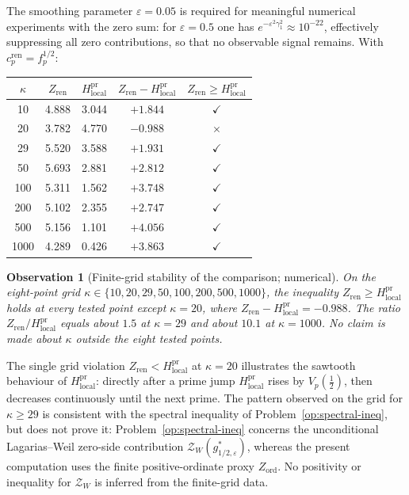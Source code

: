 \documentclass[11pt]{article}
\newtheorem{observation}[theorem]{Observation}
\newcommand{\Hlocal}{H_{\mathrm{local}}}
\newcommand{\cren}{c_p^{\mathrm{ren}}}
\newcommand{\Zren}{Z_{\mathrm{ren}}}
\begin{document}
The smoothing parameter $\varepsilon=0.05$ is required for
meaningful numerical experiments with the zero sum: for
$\varepsilon=0.5$ one has $e^{-\varepsilon^2\gamma_1^2}\approx
10^{-22}$, effectively suppressing all zero contributions, so
that no observable signal remains.
With $\cren=f_p^{1/2}$:

\begin{center}
\begin{tabular}{ccccc}
\toprule
$\kappa$ & $\Zren$ & $\Hlocal^{\mathrm{pr}}$
         & $\Zren-\Hlocal^{\mathrm{pr}}$
         & $\Zren\ge\Hlocal^{\mathrm{pr}}$ \\
\midrule
10   & 4.888 & 3.044 & $+1.844$ & $\checkmark$ \\
20   & 3.782 & 4.770 & $-0.988$ & $\times$ \\
29   & 5.520 & 3.588 & $+1.931$ & $\checkmark$ \\
50   & 5.693 & 2.881 & $+2.812$ & $\checkmark$ \\
100  & 5.311 & 1.562 & $+3.748$ & $\checkmark$ \\
200  & 5.102 & 2.355 & $+2.747$ & $\checkmark$ \\
500  & 5.156 & 1.101 & $+4.056$ & $\checkmark$ \\
1000 & 4.289 & 0.426 & $+3.863$ & $\checkmark$ \\
\bottomrule
\end{tabular}
\end{center}

\begin{observation}[Finite-grid stability of the comparison; numerical]\label{obs:Z-vs-H}
On the eight-point grid
$\kappa\in\{10,20,29,50,100,200,500,1000\}$, the inequality
$\Zren\ge\Hlocal^{\mathrm{pr}}$ holds at every tested point
except $\kappa=20$,
where $\Zren-\Hlocal^{\mathrm{pr}}=-0.988$.
The ratio $\Zren/\Hlocal^{\mathrm{pr}}$ equals about $1.5$ at
$\kappa=29$ and about $10.1$ at $\kappa=1000$.
No claim is made about $\kappa$ outside the eight tested points.
\end{observation}

The single grid violation $\Zren<\Hlocal^{\mathrm{pr}}$ at
$\kappa=20$ illustrates
the sawtooth behaviour of $\Hlocal^{\mathrm{pr}}$: directly
after a prime jump
$\Hlocal^{\mathrm{pr}}$ rises by $V_p(\tfrac12)$, then
decreases continuously until the next prime.
The pattern observed on the grid for $\kappa\ge 29$ is consistent
with the spectral inequality of Problem~\ref{op:spectral-ineq},
but does not prove it: Problem~\ref{op:spectral-ineq} concerns the unconditional
Lagarias--Weil zero-side contribution
$\mathcal{Z}_W(g^*_{1/2,\varepsilon})$, whereas the present
computation uses the finite positive-ordinate proxy
$Z_{\mathrm{ord}}$.
No positivity or inequality for $\mathcal{Z}_W$ is inferred
from the finite-grid data.
\end{document}
